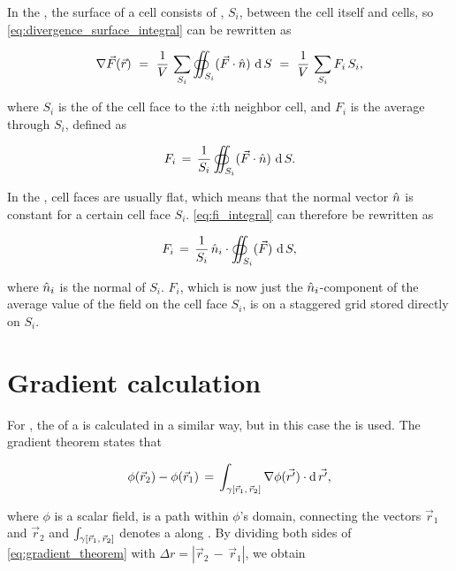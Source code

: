 In the \FVM, the surface of a cell consists of , $S_i$, between the cell itself and \neighboring cells, so \eqref{eq:divergence_surface_integral} can be rewritten as

\begin{equation} \label{eq:divergence_cell_face_sum}
\nabla\vec{F}(\vec{r})\ =\ \frac{1}{V}\,\sum_{S_i} \oiint_{S_i}(\vec{F}\cdot\hat{n})\,\operatorname{d} S\ =\ \frac{1}{V}\,\sum_{S_i} F_i\,S_i,
\end{equation}

where $S_i$ is the \area of the cell face to the $i$:th neighbor cell, and $F_i$ is the average  through $S_i$, defined as

\begin{equation} \label{eq:fi_integral}
F_i \,=\, \frac{1}{S_i}\oiint_{S_i}(\vec{F}\cdot\hat{n})\,\operatorname{d} S.
\end{equation}

In the \FVM, cell faces are usually flat, which means that the normal vector $\hat{n}$ is constant for a certain cell face $S_i$. \eqref{eq:fi_integral} can therefore be rewritten as

\begin{equation} \label{eq:fi_flat_cell_face}
F_i \,=\, \frac{1}{S_i}\,\hat{n}_i\cdot\oiint_{S_i}(\vec{F})\,\operatorname{d} S,
\end{equation}

where $\hat{n}_i$ is the normal of $S_i$. $F_i$, which is now just the $\hat{n}_i$-component of the average value of the field on the cell face $S_i$, is on a staggered grid stored directly on $S_i$.

\section{Gradient calculation}

For , the \gradient of a  is calculated in a similar way, but in this case the  is used. The gradient theorem states that

\begin{equation} \label{eq:gradient_theorem}
\phi(\vec{r}_2)-\phi(\vec{r}_1) \,=\, \int_{\gamma[\vec{r}_1,\,\vec{r}_2]}\nabla\phi(\vec{r'})\cdot \operatorname{d}\vec{r'},
\end{equation}

where $\phi$ is a scalar field, \textgammapath is a path within $\phi$'s domain, connecting the vectors $\vec{r}_1$ and $\vec{r}_2$ and $\int_{\gamma[\vec{r}_1,\,\vec{r}_2]}$ denotes a  along \textgammapath. By dividing both sides of \eqref{eq:gradient_theorem} with \mbox{$\Delta r = |\vec{r}_2\,-\,\vec{r}_1|$}, we obtain

